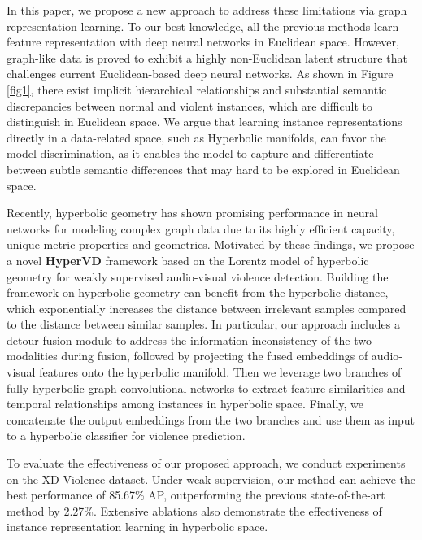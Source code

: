 \documentclass[sigconf]{acmart}
\begin{document}
In this paper, we propose a new approach to address these limitations via graph representation learning. To our best knowledge, all the previous methods learn feature representation with deep neural networks in Euclidean space. However, graph-like data is proved to exhibit a highly non-Euclidean latent structure \cite{Bronstein2016GeometricDL, Ying2018HierarchicalGR} that challenges current Euclidean-based deep neural networks. As shown in Figure \ref{fig1}, there exist implicit hierarchical relationships and substantial semantic discrepancies between normal and violent instances, which are difficult to distinguish in Euclidean space. We argue that learning instance representations directly in a data-related space, such as Hyperbolic manifolds, can favor the model discrimination, as it enables the model to capture and differentiate between subtle semantic differences that may hard to be explored in Euclidean space. 







Recently, hyperbolic geometry has shown promising performance in neural networks for modeling complex graph data due to its highly efficient capacity, unique metric properties and geometries. Motivated by these findings, we propose a novel \textbf{HyperVD} framework based on the Lorentz model \cite{Nickel_Kiela_2018} of hyperbolic geometry for weakly supervised audio-visual violence detection. Building the framework on hyperbolic geometry can benefit from the hyperbolic distance, which exponentially increases the distance between irrelevant samples compared to the distance between similar samples. In particular, our approach includes a detour fusion module to address the information inconsistency of the two modalities during fusion, followed by projecting the fused embeddings of audio-visual features onto the hyperbolic manifold. Then we leverage two branches of fully hyperbolic graph convolutional networks to extract feature similarities and temporal relationships among instances in hyperbolic space. Finally, we concatenate the output embeddings from the two branches and use them as input to a hyperbolic classifier for violence prediction. 


To evaluate the effectiveness of our proposed approach, we conduct experiments on the XD-Violence dataset. Under weak supervision, our method can achieve the best performance of 85.67\% AP, outperforming the previous state-of-the-art method by 2.27\%. Extensive ablations also demonstrate the effectiveness of instance representation learning in hyperbolic space. 
\end{document}
